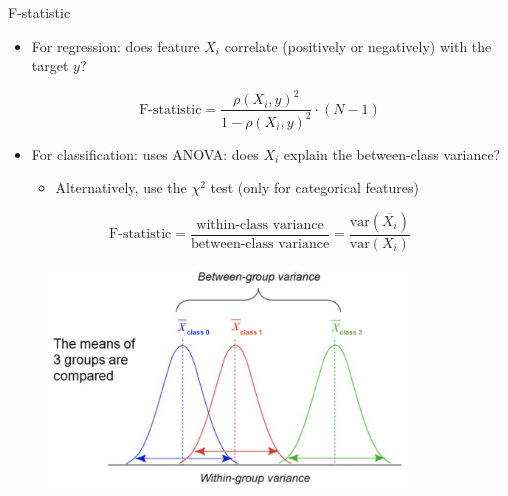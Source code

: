 \begin{frame}[allowframebreaks]{F-statistic}
\begin{itemize}
    \item For regression: does feature $X_i$ correlate (positively or negatively) with the target $y$?
\end{itemize}

\[
\text{F-statistic} = \frac{\rho(X_i, y)^2}{1 - \rho(X_i, y)^2} \cdot (N - 1)
\]

\begin{itemize}
    \item For classification: uses ANOVA: does $X_i$ explain the between-class variance?
    \begin{itemize}
        \item Alternatively, use the $\chi^2$ test (only for categorical features)
    \end{itemize}
\end{itemize}

\[
\text{F-statistic} = \frac{\text{within-class variance}}{\text{between-class variance}} = \frac{\text{var}(\overline{X_i})}{\text{var}(X_i)}
\]

\begin{figure}
    \centering
    \includegraphics[width=0.85\textwidth,keepaspectratio]{images/pre-processing/fstatistic.png}
\end{figure}
\end{frame}

